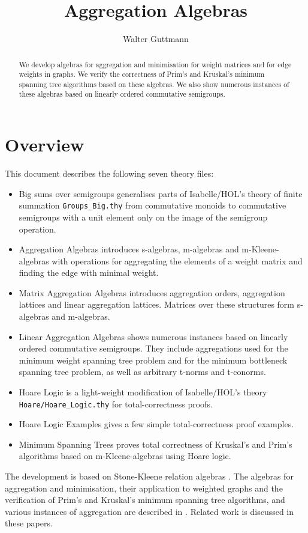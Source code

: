 \documentclass[11pt,a4paper]{article}
\begin{document}
\title{Aggregation Algebras}
\author{Walter Guttmann}
\maketitle

\begin{abstract}
  We develop algebras for aggregation and minimisation for weight matrices and for edge weights in graphs.
  We verify the correctness of Prim's and Kruskal's minimum spanning tree algorithms based on these algebras.
  We also show numerous instances of these algebras based on linearly ordered commutative semigroups.
\end{abstract}

\tableofcontents

\section{Overview}

This document describes the following seven theory files:
\begin{itemize}
\item Big sums over semigroups generalises parts of Isabelle/HOL's theory of finite summation \texttt{Groups\_Big.thy} from commutative monoids to commutative semigroups with a unit element only on the image of the semigroup operation.
\item Aggregation Algebras introduces s-algebras, m-algebras and m-Kleene-algebras with operations for aggregating the elements of a weight matrix and finding the edge with minimal weight.
\item Matrix Aggregation Algebras introduces aggregation orders, aggregation lattices and linear aggregation lattices.
      Matrices over these structures form s-algebras and m-algebras.
\item Linear Aggregation Algebras shows numerous instances based on linearly ordered commutative semigroups.
      They include aggregations used for the minimum weight spanning tree problem and for the minimum bottleneck spanning tree problem, as well as arbitrary t-norms and t-conorms.
\item Hoare Logic is a light-weight modification of Isabelle/HOL's theory \texttt{Hoare/Hoare\_Logic.thy} for total-correctness proofs.
\item Hoare Logic Examples gives a few simple total-correctness proof examples.
\item Minimum Spanning Trees proves total correctness of Kruskal's and Prim's algorithms based on m-Kleene-algebras using Hoare logic.
\end{itemize}
The development is based on Stone-Kleene relation algebras \cite{Guttmann2017b,Guttmann2017c}.
The algebras for aggregation and minimisation, their application to weighted graphs and the verification of Prim's and Kruskal's minimum spanning tree algorithms, and various instances of aggregation are described in \cite{Guttmann2016c,Guttmann2018a,Guttmann2018b}.
Related work is discussed in these papers.

\begin{flushleft}

\end{flushleft}



\end{document}
